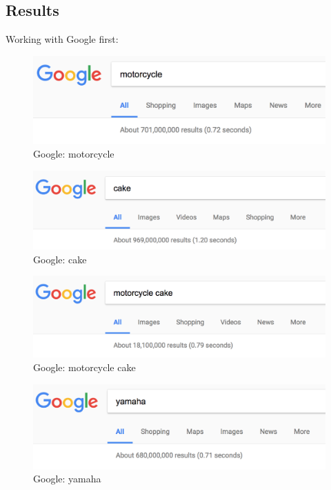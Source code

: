 \documentclass[10pt,letterpaper,bibliography=totoc]{scrartcl}
\begin{document}
\subsection {Results}
Working with Google first:
\begin{figure}[h!]
\centering
\label{fig:motorcycleGoogle}
\includegraphics[scale=.5]{motorcycle_google.png}
\caption{Google: motorcycle}
\end{figure}
\begin{figure}[h!]
\centering
\label{fig:cakeGoogle}
\includegraphics[scale=.5]{cake_google.png}
\caption{Google: cake}
\end{figure}
\begin{figure}[h!]
\centering
\label{fig:motorcycleCakeGoogle}
\includegraphics[scale=.5]{motorcycle-cake_google.png}
\caption{Google: motorcycle cake}
\end{figure}
\begin{figure}[h!]
\centering
\label{fig:yamahaGoogle}
\includegraphics[scale=.5]{yamaha_google.png}
\caption{Google: yamaha}
\end{figure}
\end{document}
